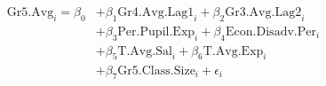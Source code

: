 
\begin{align*}
\mathrm{Gr5.Avg}_{i} = \beta_{0}
    &+ \beta_{1}  \mathrm{Gr4.Avg.Lag1}_{i}
    + \beta_{2}  \mathrm{Gr3.Avg.Lag2}_{i}    \\
    &+ \beta_{3}  \mathrm{Per.Pupil.Exp}_{i}
    + \beta_{4}  \mathrm{Econ.Disadv.Per}_{i} \\
    &+ \beta_{5}  \mathrm{T.Avg.Sal}_{i}
    + \beta_{6}  \mathrm{T.Avg.Exp}_{i}  \\
    &+ \beta_{7}  \mathrm{Gr5.Class.Size}_{i} + \epsilon_{i}
\end{align*}
